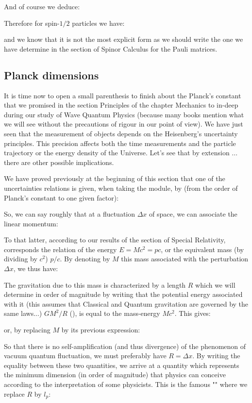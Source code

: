 	And of course we deduce:
	
	Therefore for spin-$1/2$ particles we have:
	
	and we know that it is not the most explicit form as we should write the one we have determine in the section of Spinor Calculus for the Pauli matrices.
	
	\pagebreak
	\subsection{Planck dimensions}
	It is time now to open a small parenthesis to finish about the Planck's constant that we promised in the section Principles of the chapter Mechanics to in-deep during our study of Wave Quantum Physics (because many books mention what we will see without the precautions of rigour in our point of view). We have just seen that the measurement of objects depends on the Heisenberg's uncertainty principles. This precision affects both the time measurements and the particle trajectory or the energy density of the Universe. Let's see that by extension ... there are other possible implications.

	We have proved previously at the beginning of this section that one of the uncertainties relations is given, when taking the module, by (from the order of Planck's constant to one given factor):
	
	So, we can say roughly that at a fluctuation $\Delta x$ of space, we can associate the linear momentum:
	
	To that latter, according to our results of the section of Special Relativity, corresponds the relation of the energy $E=Mc^2=pc$, or the equivalent mass (by dividing by $c^2$) $p/c$. By denoting by $M$ this mass associated with the perturbation $\Delta x$, we thus have:
	
	The gravitation due to this mass is characterized by a length $R$ which we will determine in order of magnitude by writing that the potential energy associated with it (this assumes that Classical and Quantum gravitation are governed by the same laws...) $GM^2/R$ (), is equal to the mass-energy $Mc^2$. This gives:
	
	or, by replacing $M$ by its previous expression:
	
	So that there is no self-amplification (and thus divergence) of the phenomenon of vacuum quantum fluctuation, we must preferably have $R=\Delta x$. By writing the equality between these two quantities, we arrive at a quantity which represents the minimum dimension (in order of magnitude) that physics can conceive according to the interpretation of some physicists. This is the famous "" where we replace $R$ by $l_p$:
	
